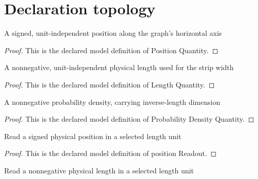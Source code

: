 \section{Declaration topology}
\begin{definition}
  \label{def:physics:phyx-mini-0645:phyxminiproblems-problemphyxmini0645-positionquantity}
  A signed, unit-independent position along the graph's horizontal axis
\end{definition}
\begin{proof}
  This is the declared model definition of Position Quantity.
\end{proof}
\begin{definition}
  \label{def:physics:phyx-mini-0645:phyxminiproblems-problemphyxmini0645-lengthquantity}
  A nonnegative, unit-independent physical length used for the strip width
\end{definition}
\begin{proof}
  This is the declared model definition of Length Quantity.
\end{proof}
\begin{definition}
  \label{def:physics:phyx-mini-0645:phyxminiproblems-problemphyxmini0645-probabilitydensityquantity}
  A nonnegative probability density, carrying inverse-length dimension
\end{definition}
\begin{proof}
  This is the declared model definition of Probability Density Quantity.
\end{proof}
\begin{definition}
  \label{def:physics:phyx-mini-0645:phyxminiproblems-problemphyxmini0645-positionreadout}
  Read a signed physical position in a selected length unit
\end{definition}
\begin{proof}
  This is the declared model definition of position Readout.
\end{proof}
\begin{definition}
  \label{def:physics:phyx-mini-0645:phyxminiproblems-problemphyxmini0645-lengthreadout}
  Read a nonnegative physical length in a selected length unit
\end{definition}

